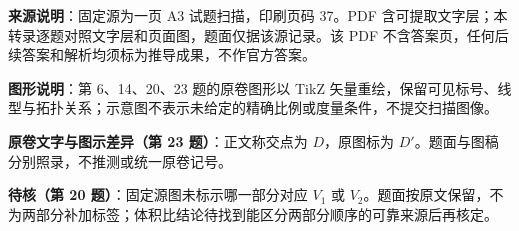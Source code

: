 

\begin{gktip}
\textbf{来源说明}：固定源为一页 A3 试题扫描，印刷页码 37。PDF 含可提取文字层；本转录逐题对照文字层和页面图，题面仅据该源记录。该 PDF 不含答案页，任何后续答案和解析均须标为推导成果，不作官方答案。

\textbf{图形说明}：第 6、14、20、23 题的原卷图形以 TikZ 矢量重绘，保留可见标号、线型与拓扑关系；示意图不表示未给定的精确比例或度量条件，不提交扫描图像。

\textbf{原卷文字与图示差异（第 23 题）}：正文称交点为 $D$，原图标为 $D'$。题面与图稿分别照录，不推测或统一原卷记号。

\textbf{待核（第 20 题）}：固定源图未标示哪一部分对应 $V_1$ 或 $V_2$。题面按原文保留，不为两部分补加标签；体积比结论待找到能区分两部分顺序的可靠来源后再核定。
\end{gktip}



